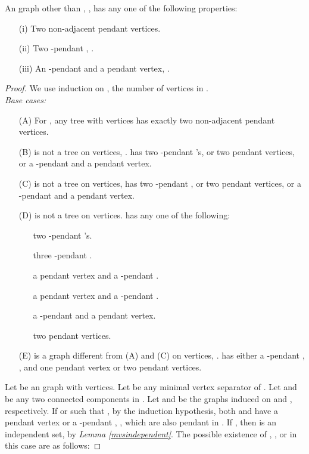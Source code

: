 \documentclass[runningheads]{llncs}
\begin{document}
\begin{lemma}
\label{specialvertex2k}
An  graph  other than , , has any one of the following properties:
\begin{itemize}
\item[(i)] Two non-adjacent pendant vertices.
\item[(ii)] Two -pendant , .
\item[(iii)] An -pendant  and a pendant vertex, .
\end{itemize}
\end{lemma}
\begin{proof}
We use induction on , the number of vertices in .\\
\noindent \emph{Base cases:} \vspace{-0.16cm}
\begin{itemize}
\item[(A)] For , any tree with  vertices has exactly two non-adjacent pendant vertices.
\item[(B)]  is not a tree on  vertices, .  has two -pendant 's, or two pendant vertices, or a -pendant  and a pendant vertex.
\item[(C)]  is not a tree on  vertices,  has two -pendant , or two pendant vertices, or a -pendant  and a pendant vertex.
\item[(D)]  is not a tree on  vertices.  has any one of the following:
\begin{itemize}
\item[] two -pendant 's.
\item[] three -pendant .
\item[] a pendant vertex and a -pendant .
\item[] a pendant vertex and a -pendant .
\item[] a -pendant  and a pendant vertex.
\item[] two pendant vertices.
\end{itemize}
 
\item[(E)]  is a graph different from (A) and (C) on  vertices, .  has either a -pendant , , and one pendant vertex or two pendant vertices.
\end{itemize}
\noindent Let  be an  graph with  vertices. Let  be any minimal vertex separator of . Let  and  be any two connected components in . Let  and  be the graphs induced on  and  , respectively. If   or  such that , by the induction hypothesis, both  and  have a pendant vertex or a -pendant , , which are also pendant in . If , then  is an independent set, by \emph{Lemma \ref{mvsindependent}}. The possible existence of , , or  in this case are as follows:


\end{proof}
\end{document}
